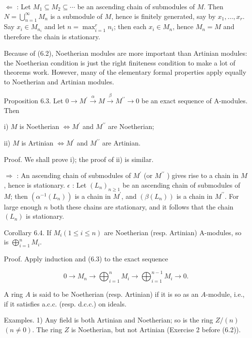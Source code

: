 \documentclass{standalone}
\theoremstyle{definition}
\theoremstyle{remark}
\begin{document}
$\Leftarrow$ : Let $M_{1} \subseteq M_{2} \subseteq \cdots$ be an ascending chain of submodules of $M$. Then $N=\bigcup_{n=1}^{\infty} M_{n}$ is a submodule of $M$, hence is finitely generated, say by $x_{1}, \ldots, x_{r}$. Say $x_{i} \in M_{n_{i}}$ and let $n=\max _{i=1}^{r} n_{i}$; then each $x_{i} \in M_{n}$, hence $M_{n}=M$ and therefore the chain is stationary.

Because of (6.2), Noetherian modules are more important than Artinian modules: the Noetherian condition is just the right finiteness condition to make a lot of theorems work. However, many of the elementary formal properties apply equally to Noetherian and Artinian modules.

Proposition 6.3. Let $0 \rightarrow M^{\prime} \stackrel{\alpha}{\rightarrow} M \stackrel{\beta}{\rightarrow} M^{\prime \prime} \rightarrow 0$ be an exact sequence of A-modules. Then

i) $M$ is Noetherian $\Leftrightarrow M^{\prime}$ and $M^{\prime \prime}$ are Noetherian;

ii) $M$ is Artinian $\Leftrightarrow M^{\prime}$ and $M^{\prime \prime}$ are Artinian.

Proof. We shall prove i); the proof of ii) is similar.

$\Rightarrow$ : An ascending chain of submodules of $M^{\prime}$ (or $M^{\prime \prime}$ ) gives rise to a chain in $M$, hence is stationary. $\epsilon$ : Let $\left(L_{n}\right)_{n \geqslant 1}$ be an ascending chain of submodules of $M$; then $\left(\alpha^{-1}\left(L_{n}\right)\right)$ is a chain in $M^{\prime}$, and $\left(\beta\left(L_{n}\right)\right)$ is a chain in $M^{\prime \prime}$. For large enough $n$ both these chains are stationary, and it follows that the chain $\left(L_{n}\right)$ is stationary.

Corollary 6.4. If $M_{i}(1 \leqslant i \leqslant n)$ are Noetherian (resp. Artinian) A-modules, so is $\bigoplus_{i=1}^{n} M_{i}$.

Proof. Apply induction and (6.3) to the exact sequence

\[
0 \rightarrow M_{n} \rightarrow \bigoplus_{i=1}^{n} M_{i} \rightarrow \bigoplus_{i=1}^{n-1} M_{i} \rightarrow 0 .
\]

A ring $A$ is said to be Noetherian (resp. Artinian) if it is so as an $A$-module, i.e., if it satisfies a.c.c. (resp. d.c.c.) on ideals.

Examples. 1) Any field is both Artinian and Noetherian; so is the ring $Z /(n)$ $(n \neq 0)$. The ring $Z$ is Noetherian, but not Artinian (Exercise 2 before (6.2)).
\end{document}

